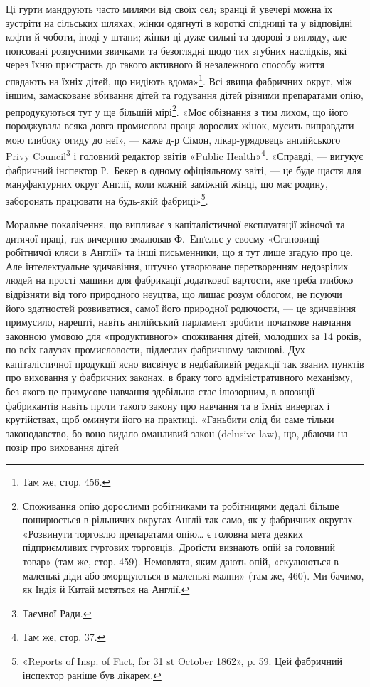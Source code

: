 \parcont{}  %
Ці гурти мандрують часто милями від своїх сел; вранці й увечері
можна їх зустріти на сільських шляхах; жінки одягнуті в короткі
спідниці та у відповідні кофти й чоботи, іноді у штани; жінки ці
дуже сильні та здорові з вигляду, але попсовані розпусними
звичками та безоглядні щодо тих згубних наслідків, які через
їхню пристрасть до такого активного й незалежного способу
життя спадають на їхніх дітей, що нидіють вдома»\footnote{
Там же, стор. 456.
}. Всі явища
фабричних округ, між іншим, замасковане вбивання дітей та
годування дітей різними препаратами опію, репродукуються тут
у ще більшій мірі\footnote{
Споживання опію дорослими робітниками та робітницями дедалі
більше поширюється в рільничих округах Англії так само, як у фабричних
округах. «Розвинути торговлю препаратами опію\dots{} є головна мета
деяких підприємливих гуртових торговців. Дроґісти визнають опій за
головний товар» (там же, стор. 459). Немовлята, яким дають опій, «скулюються
в маленькі діди або зморщуються в маленькі малпи» (там же,
\stor{}460). Ми бачимо, як Індія й Китай мстяться на Англії.
}. «Моє обізнання з тим лихом, що його породжувала
всяка довга промислова праця дорослих жінок, мусить
виправдати мою глибоку огиду до неї», — каже д-р Сімон,
лікар-урядовець англійського Privy Council\footnote*{
Таємної Ради. 
} і головний редактор
звітів «Public Health»\footnote{
Там же, стор. 37.
}. «Справді, — вигукує фабричний
інспектор Р.~Бекер в одному офіціяльному звіті, — це буде
щастя для мануфактурних округ Англії, коли кожній заміжній
жінці, що має родину, заборонять працювати на будь-якій
фабриці»\footnote{
«Reports of Insp. of Fact, for 31 st October 1862», p. 59. Цей фабричний
інспектор раніше був лікарем.
}.

Моральне покалічення, що випливає з капіталістичної експлуатації
жіночої та дитячої праці, так вичерпно змалював Ф.~Енґельс
у своєму «Становищі робітничої кляси в Англії» та інші письменники,
що я тут лише згадую про це. Але інтелектуальне здичавіння,
штучно утворюване перетворенням недозрілих людей на
прості машини для фабрикації додаткової вартости, яке треба
глибоко відрізняти від того природного неуцтва, що лишає розум
облогом, не псуючи його здатностей розвиватися, самої його природної
родючости, — це здичавіння примусило, нарешті, навіть
англійський парламент зробити початкове навчання законною
умовою для «продуктивного» споживання дітей, молодших за
14 років, по всіх галузях промисловости, підлеглих фабричному
законові. Дух капіталістичної продукції ясно висвічує в недбайливій
редакції так званих пунктів про виховання у фабричних
законах, в браку того адміністративного механізму, без якого це
примусове навчання здебільша стає ілюзорним, в опозиції фабрикантів
навіть проти такого закону про навчання та в їхніх вивертах
і крутійствах, щоб оминути його на практиці. «Ганьбити
слід би саме тільки законодавство, бо воно видало оманливий
закон (delusive law), що, дбаючи на позір про виховання дітей
\parbreak{}  %
